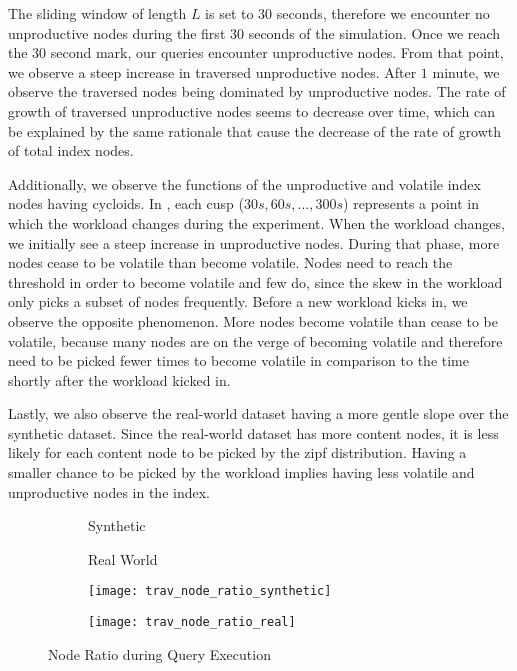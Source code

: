\documentclass[abstracton,12pt]{scrartcl}
\theoremstyle{definition}
\begin{document}
The sliding window of length $L$ is set to $30$ seconds, therefore we encounter no
unproductive nodes during the first $30$ seconds of the simulation. Once we
reach the $30$ second mark, our queries encounter unproductive nodes.
From that point, we observe a steep increase in traversed unproductive nodes.
After $1$ minute, we observe the traversed nodes being dominated by
unproductive nodes. The rate of growth of traversed unproductive nodes seems to
decrease over time, which can be explained by the same rationale that cause the
decrease of the rate of growth of total index nodes.

Additionally, we observe the functions of the unproductive and volatile index
nodes having cycloids. In , each cusp ($30 s, 60 s,
\dots, 300 s$) represents a point in which the workload changes during the
experiment. When the workload changes, we initially see a steep increase in
unproductive nodes. During that phase, more nodes cease to be volatile than
become volatile. Nodes need to reach the threshold in order to become volatile
and few do, since the skew in the workload only picks a subset of
nodes frequently. Before a new workload kicks in, we observe the opposite
phenomenon. More nodes become volatile than cease to be volatile, because many nodes are
on the verge of becoming volatile and therefore need to be picked fewer times to
become volatile in comparison to the time shortly after the workload kicked in. 

Lastly, we also observe the real-world dataset having a more gentle slope over
the synthetic dataset. Since
the real-world dataset has more content nodes, it is less likely for each
content node to be picked by the zipf distribution. Having a smaller chance to be
picked by the workload implies having less volatile and unproductive nodes in
the index.  

\begin{figure}
  \centering
  \begin{subfigure}{0.49\linewidth}
    \centering
    Synthetic
  \end{subfigure}
  \begin{subfigure}{0.49\linewidth}
    \centering
    Real World
  \end{subfigure}
  \begin{subfigure}{0.49\linewidth}
    \centering
    \texttt{[image: trav\_node\_ratio\_synthetic]}
    \caption{}
    \label{fig:trav_node_ratio_synthetic}
  \end{subfigure}
  \begin{subfigure}{0.49\linewidth}
    \centering
    \texttt{[image: trav\_node\_ratio\_real]}
    \caption{}
    \label{fig:trav_node_ratio_real}
  \end{subfigure}
  \caption{Node Ratio during Query Execution}
  \label{fig:trav_node_ratio}
\end{figure}
\end{document}
